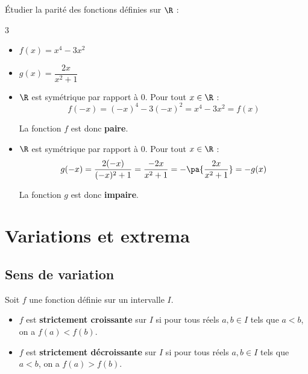 \newpage

\begin{methode}
	Étudier la parité des fonctions définies sur $\R$ :
	\begin{multicols}{3}
		\begin{itemize}
			\item $f(x) = x^4 - 3x^2$
			\item $g(x) = \dfrac{2x}{x^2 + 1}$
		\end{itemize}
	\end{multicols}

	\begin{correction}
		\nline
		\begin{itemize}
			\item $\R$ est symétrique par rapport à $0$. Pour tout $x \in \R$ :
			      \[
				      f(-x) = (-x)^4 - 3(-x)^2 = x^4 - 3x^2 = f(x)
			      \]

			      La fonction $f$ est donc \textbf{paire}.
			\item $\R$ est symétrique par rapport à $0$. Pour tout $x \in \R$ :
			      \[
				      g(-x) = \dfrac{2(-x)}{(-x)^2 + 1} = \dfrac{-2x}{x^2 + 1} = -\pa{\dfrac{2x}{x^2 + 1}} = -g(x)
			      \]

			      La fonction $g$ est donc \textbf{impaire}.
		\end{itemize}
	\end{correction}
\end{methode}

\section{Variations et extrema}

\subsection{Sens de variation}

\begin{defin}
	Soit $f$ une fonction définie sur un intervalle $I$.
	\begin{itemize}
		\item $f$ est \textbf{strictement croissante} sur $I$ si pour tous réels $a, b \in I$ tels que $a < b$, on a $f(a) < f(b)$.
		\item $f$ est \textbf{strictement décroissante} sur $I$ si pour tous réels $a, b \in I$ tels que $a < b$, on a $f(a) > f(b)$.
	\end{itemize}
\end{defin}

